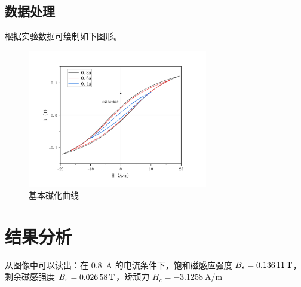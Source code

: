\documentclass[a4paper,utf8]{article}
\begin{document}
\subsection{数据处理}
根据实验数据可绘制如下图形。
\begin{figure}[!ht]
    \begin{floatrow}
    \end{floatrow}
\end{figure}
\begin{figure}[!ht]
    \caption{基本磁化曲线}
    \includegraphics[width=0.7\textwidth]{wjj/fig1c.pdf}
\end{figure}
\section{结果分析}
从图像中可以读出：在 \SI{0.8}{\A} 的电流条件下，饱和磁感应强度 $B_s=\SI{0.13611}{\T}$，剩余磁感强度 $B_r=\SI{0.02658}{\T}$，矫顽力 $H_c=\SI{-3.1258}{\A\per\m}$
\end{document}
